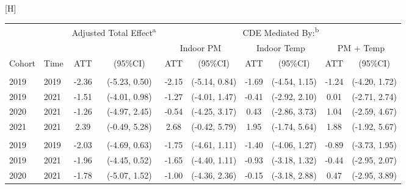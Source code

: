 \documentclass[
  letterpaper,
  DIV=11,
  numbers=noendperiod]{scrartcl}
\makeatletter
\renewenvironment{table}%
  {\renewcommand\familydefault\sfdefault
   \@float{table}}
  {\end@float}
\makeatother
\begin{document}
\hypertarget{tbl-a-bp-med-het}{}
\begin{table}[H]
\caption{\label{tbl-a-bp-med-het}Heterogenous treatment effects for blood pressure mediation model }\tabularnewline

\centering\begingroup\fontsize{10}{12}\selectfont

\begin{threeparttable}
\begin{tabular}{llcccccccc}
\toprule
\multicolumn{2}{c}{ } & \multicolumn{2}{c}{Adjusted Total Effect\textsuperscript{a}} & \multicolumn{6}{c}{CDE Mediated By:\textsuperscript{b}} \\
\cmidrule(l{3pt}r{3pt}){3-4} \cmidrule(l{3pt}r{3pt}){5-10}
\multicolumn{4}{c}{ } & \multicolumn{2}{c}{Indoor PM} & \multicolumn{2}{c}{Indoor Temp} & \multicolumn{2}{c}{PM + Temp} \\
\cmidrule(l{3pt}r{3pt}){5-6} \cmidrule(l{3pt}r{3pt}){7-8} \cmidrule(l{3pt}r{3pt}){9-10}
Cohort & Time & ATT & (95\%CI) & ATT & (95\%CI) & ATT & (95\%CI) & ATT & (95\%CI)\\
\midrule
\addlinespace[0.3em]
\multicolumn{10}{l}{\textbf{Brachial SBP}}\\
\hspace{1em}2019 & 2019 & -2.36 & (-5.23, 0.50) & -2.15 & (-5.14, 0.84) & -1.69 & (-4.54, 1.15) & -1.24 & (-4.20, 1.72)\\
\hspace{1em}2019 & 2021 & -1.51 & (-4.01, 0.98) & -1.27 & (-4.01, 1.47) & -0.41 & (-2.92, 2.10) & 0.01 & (-2.71, 2.74)\\
\hspace{1em}2020 & 2021 & -1.26 & (-4.97, 2.45) & -0.54 & (-4.25, 3.17) & 0.43 & (-2.86, 3.73) & 1.04 & (-2.59, 4.67)\\
\hspace{1em}2021 & 2021 & 2.39 & (-0.49, 5.28) & 2.68 & (-0.42, 5.79) & 1.95 & (-1.74, 5.64) & 1.88 & (-1.92, 5.67)\\
\addlinespace[0.3em]
\multicolumn{10}{l}{\textbf{Central SBP}}\\
\hspace{1em}2019 & 2019 & -2.03 & (-4.69, 0.63) & -1.75 & (-4.61, 1.11) & -1.40 & (-4.06, 1.27) & -0.89 & (-3.73, 1.95)\\
\hspace{1em}2019 & 2021 & -1.96 & (-4.45, 0.52) & -1.65 & (-4.40, 1.11) & -0.93 & (-3.18, 1.32) & -0.44 & (-2.95, 2.07)\\
\hspace{1em}2020 & 2021 & -1.78 & (-5.07, 1.52) & -1.00 & (-4.36, 2.36) & -0.15 & (-3.18, 2.88) & 0.47 & (-2.95, 3.89)\\

\end{tabular}
\end{threeparttable}
\end{table}
\end{document}
